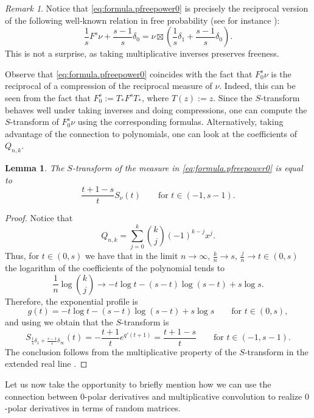\documentclass[reqno,11pt]{amsart}
\newtheorem{lemma}[theorem]{Lemma}
\theoremstyle{remark}
\newtheorem{remark}[theorem]{Remark}
\newcommand{\freepower}[1]{F^{#1}}
\newcommand{\pfreepower}[2]{F_{#1}^{#2}}
\begin{document}
\begin{remark}
Notice that \eqref{eq:formula.pfreepower0} is precisely the reciprocal version of the following well-known relation in free probability (see for instance \cite[Exercise 14.21]{nica2006lectures}):
$$ \frac{1}{s}\freepower{s} \nu + \frac{s-1}{s}\delta_{0} = \nu \boxtimes \left(\frac{1}{s}\delta_1+\frac{s-1}{s}\delta_0\right).$$    
This is not a surprise, as taking multiplicative inverses preserves freeness.
\end{remark}

Observe that \eqref{eq:formula.pfreepower0} coincides with the fact that $\pfreepower{0}{s}\nu$ is the reciprocal of a compression of the reciprocal measure of $\nu$. Indeed, this can be seen from the fact that $\pfreepower{0}{s}:= T_* \freepower{s} T_*$, where $T(z):=z$. Since the $S$-transform behaves well under taking inverses and doing compressions, one can compute the $S$-transform of $\pfreepower{0}{s}\nu$ using the corresponding formulas. Alternatively, taking advantage of the connection to polynomials, one can look at the coefficients of $Q_{n,k}$.

\begin{lemma}
The $S$-transform of the measure in \eqref{eq:formula.pfreepower0} is equal to
$$  \frac{t+1-s}{t}S_\nu(t) \qquad \text{for }t\in(-1,s-1).$$
\end{lemma}

\begin{proof}
Notice that
$$Q_{n,k}= \sum_{j=0}^k \binom{k}{j} (-1)^{k-j} x^{j}.$$
Thus, for $t \in(0,s)$ we have that in the limit $n\to\infty,\, \tfrac{k}{n}\to s,\, \tfrac{j}{n}\to t \in(0,s)$  the logarithm of the coefficients of the polynomial tends to
$$\frac{1}{n}\log \binom{k}{j} \to -t \log t -(s-t)\log (s-t) +s\log s.$$
Therefore, the exponential profile is 
$$g(t)=-t \log t -(s-t)\log (s-t) +s\log s \qquad 
\text{for }  t\in(0,s),$$
and using \cite[Equation (65)]{jalowy2025zeros} we obtain that the $S$-transform is 
$$S_{\frac{1}{s}\delta_1+\frac{s-1}{s}\delta_\infty} (t)=-\frac{t+1}{t}e^{q'(t+1)}= \frac{t+1-s}{t} \qquad \text{for }t\in(-1,s-1) .$$
The conclusion follows from the multiplicative property of the $S$-transform in the extended real line \cite[Proposition 6.6]{jalowy2025zeros}.
\end{proof}


Let us now take the opportunity to briefly mention how we can use the connection between 0-polar derivatives and multiplicative convolution to realize $0$-polar derivatives in terms of random matrices.
\end{document}
